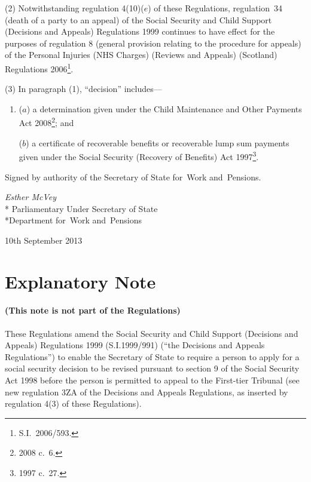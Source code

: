 \documentclass[12pt,a4paper]{article}
\begin{document}
(2) Notwithstanding regulation 4(10)($e$)  of these Regulations, regulation~34 (death of a party to an appeal) of the Social Security and Child Support (Decisions and Appeals) Regulations 1999 continues to have effect for the purposes of regulation 8 (general provision relating to the procedure for appeals) of the Personal Injuries (NHS Charges) (Reviews and Appeals) (Scotland) Regulations 2006\footnote{S.I.~2006/593.}.%

(3) In paragraph (1), “decision” includes—
\begin{enumerate}\item[]
($a$) a determination given under the Child Maintenance and Other Payments Act 2008\footnote{2008 c.~6.}; and

($b$) a certificate of recoverable benefits or recoverable lump sum payments given under
 the Social Security (Recovery of Benefits) Act 1997\footnote{1997 c.~27.}.
\end{enumerate}

\bigskip

\pagebreak[3]

Signed 
by authority of the 
Secretary of State for~Work and~Pensions.

{\raggedleft
\emph{Esther McVey}\\*
Parliamentary Under Secretary 
of State\\*Department 
for~Work and~Pensions

}

10th September 2013

\small

\part{Explanatory Note}

\renewcommand\parthead{— Explanatory Note}

\subsection*{(This note is not part of the Regulations)}

These Regulations amend the Social Security and Child Support (Decisions and Appeals) Regulations 1999 (S.I.1999/991) (“the Decisions and Appeals Regulations”) to enable the Secretary of State to require a person to apply for a social security decision to be revised pursuant to section 9 of the Social Security Act 1998 before the person is permitted to appeal to the First-tier Tribunal (see new regulation 3ZA of the Decisions and Appeals Regulations, as inserted by regulation 4(3) of these Regulations).
\end{document}
